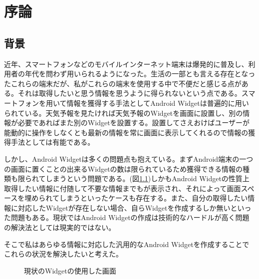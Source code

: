 \chapter{序論}
\label{chap:introduction}
\section{背景}


近年、スマートフォンなどのモバイルインターネット端末は爆発的に普及し、利用者の年代を問わず用いられるようになった。生活の一部とも言える存在となったこれらの端末だが、私がこれらの端末を使用する中で不便だと感じる点がある。それは取得したいと思う情報を思うように得られないという点である。スマートフォンを用いて情報を獲得する手法としてAndroid Widgetは普遍的に用いられている。天気予報を見たければ天気予報のWidgetを画面に設置し、別の情報が必要であればまた別のWidgetを設置する。設置してさえおけばユーザーが能動的に操作をしなくとも最新の情報を常に画面に表示してくれるので情報の獲得手法としては有能である。

しかし、Android Widgetは多くの問題点も抱えている。まずAndroid端末の一つの画面に置くことの出来るWidgetの数は限られているため獲得できる情報の種類も限られてしまうという問題である。(図\ref{fig:old_widget})しかもAndroid Widgetの性質上取得したい情報に付随して不要な情報までもが表示され、それによって画面スペースを埋められてしまうといったケースも存在する。また、自分の取得したい情報に対応したWidgetが存在しない場合、自らWidgetを作成するしか無いといった問題もある。現状ではAndroid Widgetの作成は技術的なハードルが高く問題の解決法としては現実的ではない。

そこで私はあらゆる情報に対応した汎用的なAndroid Widgetを作成することでこれらの状況を解決したいと考えた。

\begin{figure}[htbp]
  \begin{minipage}{\hsize}
    \begin{center}
    \end{center}
    \caption{現状のWidgetの使用した画面}
    \label{fig:old_widget}
  \end{minipage}
\end{figure}

